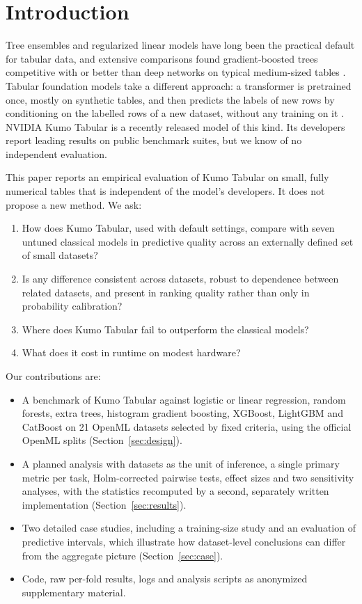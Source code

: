 \section{Introduction}
\label{sec:intro}

Tree ensembles and regularized linear models have long been the practical default for tabular data, and extensive
comparisons found gradient-boosted trees competitive with or better than deep networks on typical medium-sized tables
\citep{shwartzziv2022tabular,grinsztajn2022tree,borisov2024survey}. Tabular foundation models take a different
approach: a transformer is pretrained once, mostly on synthetic tables, and then predicts the labels of new rows by
conditioning on the labelled rows of a new dataset, without any training on it
\citep{hollmann2023tabpfn,hollmann2025tabpfn,qu2025tabicl}. NVIDIA Kumo Tabular \citep{nvidia_kumo_card,nvidia_kumo_blog}
is a recently released model of this kind. Its developers report leading results on public benchmark suites, but we know
of no independent evaluation.

This paper reports an empirical evaluation of Kumo Tabular on small, fully numerical tables that is independent of
the model's developers. It does not propose a new method. We ask:
\begin{enumerate}
\item[\textbf{RQ1}] How does Kumo Tabular, used with default settings, compare with seven untuned classical models in
predictive quality across an externally defined set of small datasets?
\item[\textbf{RQ2}] Is any difference consistent across datasets, robust to dependence between related datasets, and
present in ranking quality rather than only in probability calibration?
\item[\textbf{RQ3}] Where does Kumo Tabular fail to outperform the classical models?
\item[\textbf{RQ4}] What does it cost in runtime on modest hardware?
\end{enumerate}

Our contributions are:
\begin{itemize}
\item A benchmark of Kumo Tabular against logistic or linear regression, random forests, extra trees, histogram
gradient boosting, XGBoost, LightGBM and CatBoost on 21 OpenML datasets selected by fixed criteria, using the official
OpenML splits (Section~\ref{sec:design}).
\item A planned analysis with datasets as the unit of inference, a single primary metric per task, Holm-corrected
pairwise tests, effect sizes and two sensitivity analyses, with the statistics recomputed by a second, separately written
implementation (Section~\ref{sec:results}).
\item Two detailed case studies, including a training-size study and an evaluation of predictive intervals, which
illustrate how dataset-level conclusions can differ from the aggregate picture (Section~\ref{sec:case}).
\item Code, raw per-fold results, logs and analysis scripts as anonymized supplementary material.
\end{itemize}
